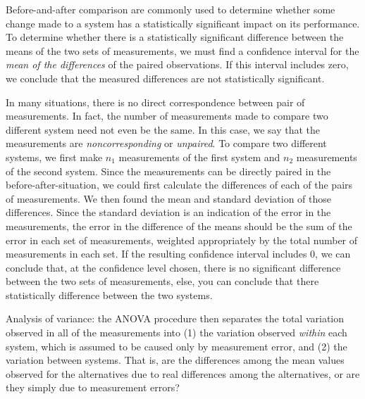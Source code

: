 \documentclass[openany, a4paper]{book}
\theoremstyle{break}
\theoremstyle{example}
\theoremstyle{note}
\theoremstyle{break}
\theoremstyle{exercise}
\begin{document}
Before-and-after comparison are commonly used to determine whether some
change made to a system has a statistically significant impact on its
performance. To determine whether there is a statistically significant
difference between the means of the two sets of measurements, we must find a
confidence interval for the \emph{mean of the differences} of the paired
observations. If this interval includes zero, we conclude that the measured
differences are not statistically significant.

In many situations, there is no direct correspondence between pair of
measurements. In fact, the number of measurements made to compare two
different system need not even be the same. In this case, we say that the
measurements are \emph{noncorresponding} or \emph{unpaired}.
To compare two different systems, we first make \(n_1\) measurements of the
first system and \(n_2\) measurements of the second system. Since the
measurements can be directly paired in the before-after-situation, we could
first calculate the differences of each of the pairs of measurements. We
then found the mean and standard deviation of those differences. Since the
standard deviation is an indication of the error in the measurements, the
error in the difference of the means should be the sum of the error in each
set of measurements, weighted appropriately by the total number of
measurements in each set. If the resulting confidence interval includes 0,
we can conclude that, at the confidence level chosen, there is no
significant difference between the two sets of measurements, else, you can
conclude that there statistically difference between the two systems.

Analysis of variance: the ANOVA procedure then separates the total variation
observed in all of the measurements into (1) the variation observed \emph{within}
each system, which is assumed to be caused only by measurement error, and
(2) the variation between systems. That is, are the differences among the
mean values observed for the alternatives due to real differences among the
alternatives, or are they simply due to measurement errors?
\end{document}
